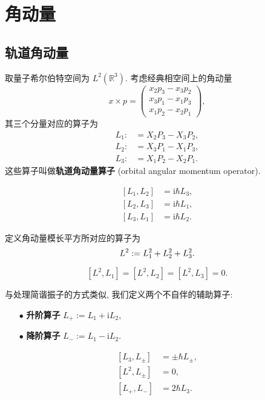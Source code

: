 \section{角动量}
\subsection{轨道角动量}
取量子希尔伯特空间为 $ L^2(\mathbb{R}^3) $. 考虑经典相空间上的角动量
\[ x\times p=\left( \begin{matrix}
    x_2p_3-x_3p_2\\ 
    x_3p_1-x_1p_3\\ 
    x_1p_2-x_2p_1
\end{matrix} \right), \]
其三个分量对应的算子为
\begin{align*}
    L_1 :&= X_2P_3-X_3P_2,\\ 
    L_2 :&= X_3P_1-X_1P_3,\\ 
    L_3 :&= X_1P_2-X_2P_1.
\end{align*}
这些算子叫做{\bf 轨道角动量算子} (orbital angular momentum operator).
\vspace{1ex}
\begin{proposition}\keepline
    \[ \begin{aligned}
        [L_1,L_2] &= \mathrm{i}\hbar L_3,\\ 
        [L_2,L_3] &= \mathrm{i}\hbar L_1,\\ 
        [L_3,L_1] &= \mathrm{i}\hbar L_2.
    \end{aligned} \]
\end{proposition}
定义角动量模长平方所对应的算子为
\[ L^2:=L_1^2+L_2^2+L_3^2.\vspace{1ex} \]
\begin{proposition}\keepline
    \[ [L^2,L_1]=[L^2,L_2]=[L^2,L_3]=0. \]
\end{proposition}
\vspace{1ex}
与处理简谐振子的方式类似, 我们定义两个不自伴的辅助算子:
\begin{enumerate}
    \item[$ \bullet $] {\bf 升阶算子} $ L_+:=L_1+\mathrm{i}L_2 $,
    \item[$ \bullet $] {\bf 降阶算子} $ L_-:=L_1-\mathrm{i}L_2 $. 
\end{enumerate}
\vspace{0ex}
\begin{proposition}\keepline
    \[ \begin{aligned}
        [L_3,L_{\pm}] &= \pm\hbar L_{\pm},\\ 
        [L^2,L_{\pm}] &= 0,\\ 
        [L_+,L_-] &= 2\hbar L_3.
    \end{aligned} \]
\end{proposition}

